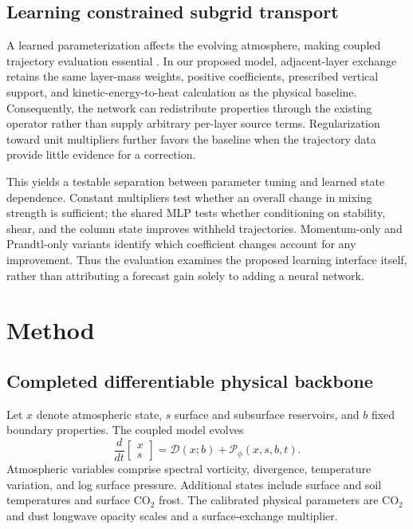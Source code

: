 \documentclass{article}
\begin{document}
\subsection{Learning constrained subgrid transport}
A learned parameterization affects the evolving atmosphere, making coupled
trajectory evaluation essential \citep{yuval2020stable}.
In our proposed model, adjacent-layer exchange retains the same layer-mass
weights, positive coefficients, prescribed vertical support, and
kinetic-energy-to-heat calculation as the physical baseline. Consequently,
the network can redistribute properties through the existing operator rather
than supply arbitrary per-layer source terms. Regularization toward unit
multipliers further favors the baseline when the trajectory data provide
little evidence for a correction.

This yields a testable separation between parameter tuning and learned
state dependence. Constant multipliers test whether an overall change in
mixing strength is sufficient; the shared MLP tests whether conditioning on
stability, shear, and the column state improves withheld trajectories.
Momentum-only and Prandtl-only variants identify which coefficient changes
account for any improvement. Thus the evaluation examines the proposed
learning interface itself, rather than attributing a forecast gain solely
to adding a neural network.

\section{Method}
\subsection{Completed differentiable physical backbone}
Let \(x\) denote atmospheric state, \(s\) surface and subsurface reservoirs,
and \(b\) fixed boundary properties. The coupled model evolves
\begin{equation}
\frac{d}{dt}\begin{bmatrix}x\\s\end{bmatrix}
=\mathcal D(x;b)+\mathcal P_\phi(x,s,b,t).
\end{equation}
Atmospheric variables comprise spectral vorticity, divergence, temperature
variation, and log surface pressure. Additional states include surface and
soil temperatures and surface CO$_2$ frost. The calibrated physical parameters
are CO$_2$ and dust longwave opacity scales and a surface-exchange multiplier.
\end{document}

